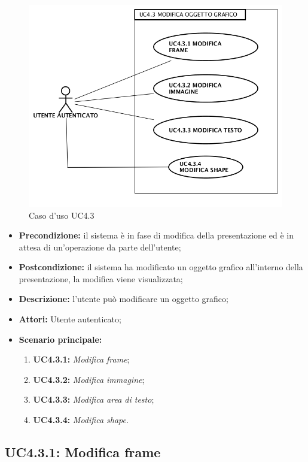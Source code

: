 \begin{figure}[h]
	\begin{center}
	\includegraphics[scale=0.4]{diagram/UC4-3.png}
	\caption{Caso d'uso UC4.3}
	\end{center}
\end{figure}
\begin{itemize}
	\item \textbf{Precondizione:} il sistema è in fase di modifica della presentazione ed è in attesa di un'operazione da parte dell'utente;
	\item \textbf{Postcondizione:} il sistema ha modificato un oggetto grafico all'interno della presentazione, la modifica viene visualizzata;
	\item \textbf{Descrizione:} l'utente può modificare un oggetto grafico;
	\item \textbf{Attori:} Utente autenticato;
	\item \textbf{Scenario principale:}
	\begin{enumerate}
		\item \textbf{ UC4.3.1:} \textit{ Modifica frame};
		\item \textbf{ UC4.3.2:} \textit{ Modifica immagine};
		\item \textbf{ UC4.3.3:} \textit{ Modifica area di testo};
		\item \textbf{ UC4.3.4:} \textit{ Modifica shape}.
	\end{enumerate}
\end{itemize}
\subsection{ UC4.3.1: Modifica frame}

